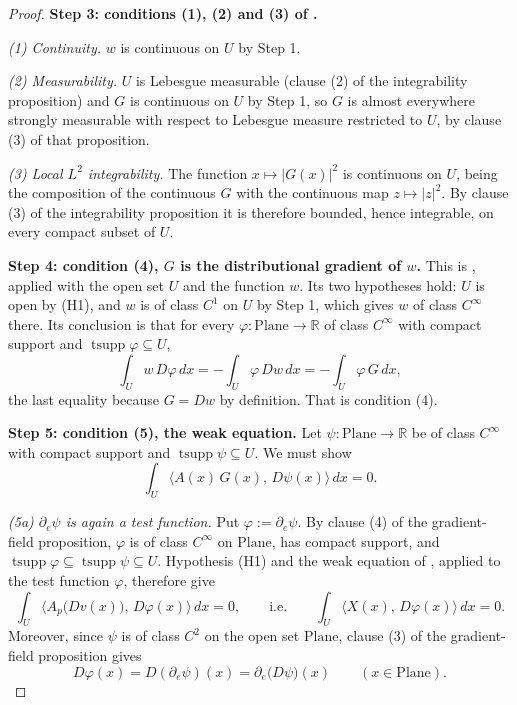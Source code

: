 \begin{proof}
\medskip\noindent\textbf{Step 3: conditions (1), (2) and (3) of .}

\emph{(1) Continuity.}  $w$ is continuous on $U$ by Step 1.

\emph{(2) Measurability.}  $U$ is Lebesgue measurable (clause (2) of the integrability
proposition) and $G$ is continuous on $U$ by Step 1, so $G$ is almost everywhere strongly
measurable with respect to Lebesgue measure restricted to $U$, by clause (3) of that
proposition.

\emph{(3) Local $L^{2}$ integrability.}  The function $x\mapsto\lvert G(x)\rvert^{2}$ is
continuous on $U$, being the composition of the continuous $G$ with the continuous map
$z\mapsto\lvert z\rvert^{2}$.  By clause (3) of the integrability proposition it is therefore
bounded, hence integrable, on every compact subset of $U$.

\medskip\noindent\textbf{Step 4: condition (4), $G$ is the distributional gradient of $w$.}
This is , applied with the open set $U$ and the function $w$.
Its two hypotheses hold: $U$ is open by (H1), and $w$ is of class $C^{1}$ on $U$ by Step 1,
which gives $w$ of class $C^{\infty}$ there.  Its conclusion is that for every
$\varphi\colon\mathrm{Plane}\to\mathbb{R}$ of class $C^{\infty}$ with compact support and
$\operatorname{tsupp}\varphi\subseteq U$,
\[
  \int_U w\,D\varphi\,dx=-\int_U\varphi\,Dw\,dx=-\int_U\varphi\,G\,dx ,
\]
the last equality because $G=Dw$ by definition.  That is condition (4).

\medskip\noindent\textbf{Step 5: condition (5), the weak equation.}
Let $\psi\colon\mathrm{Plane}\to\mathbb{R}$ be of class $C^{\infty}$ with compact support and
$\operatorname{tsupp}\psi\subseteq U$.  We must show
\begin{equation}\label{eq:de-goal}
  \int_U\bigl\langle A(x)\,G(x),\,D\psi(x)\bigr\rangle\,dx=0 .
\end{equation}

\emph{(5a) $\partial_e\psi$ is again a test function.}  Put $\varphi:=\partial_e\psi$.  By
clause (4) of the gradient-field proposition, $\varphi$ is of class $C^{\infty}$ on
$\mathrm{Plane}$, has compact support, and
$\operatorname{tsupp}\varphi\subseteq\operatorname{tsupp}\psi\subseteq U$.  Hypothesis (H1) and
the weak equation of , applied to the test function $\varphi$, therefore give
\begin{equation}\label{eq:de-weak}
  \int_U\bigl\langle A_p\bigl(Dv(x)\bigr),\,D\varphi(x)\bigr\rangle\,dx=0,
  \qquad\text{i.e.}\qquad
  \int_U\bigl\langle X(x),\,D\varphi(x)\bigr\rangle\,dx=0 .
\end{equation}
Moreover, since $\psi$ is of class $C^{2}$ on the open set $\mathrm{Plane}$, clause (3) of the
gradient-field proposition gives
\begin{equation}\label{eq:de-sym}
  D\varphi(x)=D(\partial_e\psi)(x)=\partial_e\bigl(D\psi\bigr)(x)
  \qquad(x\in\mathrm{Plane}).
\end{equation}


\end{proof}
